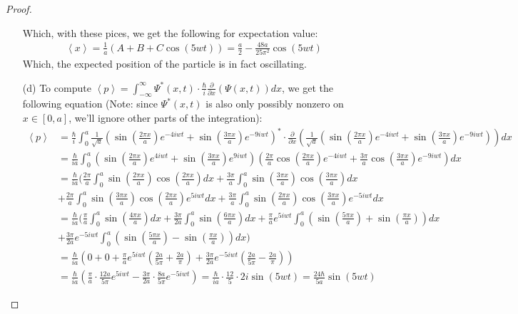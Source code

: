 \documentclass{article}
\begin{document}
\begin{proof}
\begin{itemize}
        Which, with these pices, we get the following for expectation value:
        \begin{align}
            \left<x\right>= \frac{1}{a}\left(A+B+C\cos(5wt)\right) = \frac{a}{2}-\frac{48a}{25\pi^2}\cos(5wt)
        \end{align}
        Which, the expected position of the particle is in fact oscillating.

        \hfil

        \item[(d)] To compute $\left<p\right>=\int_{-\infty}^{\infty}\Psi^*(x,t) \cdot \frac{\hbar}{i}\frac{\partial}{\partial x}(\Psi(x,t))dx$, we get the following equation (Note: since $\Psi^*(x,t)$ is also only possibly nonzero on $x\in [0,a]$, we'll ignore other parts of the integration):
        \begin{align}
            \left<p\right>&=\frac{\hbar}{i}\int_{0}^{a}\frac{1}{\sqrt{a}}\left(\sin\left(\frac{2\pi x}{a}\right)e^{-4iwt}+\sin\left(\frac{3\pi x}{a}\right)e^{-9iwt}\right)^*\cdot \frac{\partial}{\partial x}\left(\frac{1}{\sqrt{a}}\left(\sin\left(\frac{2\pi x}{a}\right)e^{-4iwt}+\sin\left(\frac{3\pi x}{a}\right)e^{-9iwt}\right) \right) dx\\
            &= \frac{\hbar}{ia}\int_{0}^{a}\left(\sin\left(\frac{2\pi x}{a}\right)e^{4iwt}+\sin\left(\frac{3\pi x}{a}\right)e^{9iwt}\right)\left(\frac{2\pi}{a}\cos\left(\frac{2\pi x}{a}\right)e^{-4iwt}+\frac{3\pi}{a}\cos\left(\frac{3\pi x}{a}\right)e^{-9iwt}\right)dx\\
            &=\frac{\hbar}{ia}(\frac{2\pi}{a}\int_{0}^{a}\sin\left(\frac{2\pi x}{a}\right)\cos\left(\frac{2\pi x}{a}\right)dx + \frac{3\pi}{a}\int_{0}^{a}\sin\left(\frac{3\pi x}{a}\right)\cos\left(\frac{3\pi x}{a}\right)dx\\ 
            &+\frac{2\pi}{a}\int_{0}^{a}\sin\left(\frac{3\pi x}{a}\right)\cos\left(\frac{2\pi x}{a}\right)e^{5iwt}dx+\frac{3\pi}{a}\int_{0}^{a}\sin\left(\frac{2\pi x}{a}\right)\cos\left(\frac{3\pi x}{a}\right)e^{-5iwt}dx\\
            &= \frac{\hbar}{ia}(\frac{\pi}{a}\int_{0}^{a}\sin\left(\frac{4\pi x}{a}\right)dx + \frac{3\pi}{2a}\int_{0}^{a}\sin\left(\frac{6\pi x}{a}\right)dx +\frac{\pi}{a}e^{5iwt}\int_{0}^{a}\left(\sin\left(\frac{5\pi x}{a}\right)+\sin\left(\frac{\pi x}{a}\right)\right)dx\\
            & + \frac{3\pi}{2a}e^{-5iwt}\int_{0}^{a}\left(\sin\left(\frac{5\pi x}{a}\right)-\sin\left(\frac{\pi x}{a}\right)\right)dx)\\
            &= \frac{\hbar}{ia}\left(0+0+\frac{\pi}{a}e^{5iwt}\left(\frac{2a}{5\pi}+\frac{2a}{\pi}\right) + \frac{3\pi}{2a}e^{-5iwt}\left(\frac{2a}{5\pi}-\frac{2a}{\pi}\right)\right)\\
            &= \frac{\hbar}{ia}\left(\frac{\pi}{a}\cdot\frac{12a}{5\pi}e^{5iwt}-\frac{3\pi}{2a}\cdot\frac{8a}{5\pi}e^{-5iwt}\right) = \frac{\hbar}{ia}\cdot \frac{12}{5}\cdot 2i \sin(5wt) = \frac{24\hbar}{5a}\sin(5wt)
        \end{align}


\end{itemize}
\end{proof}
\end{document}
